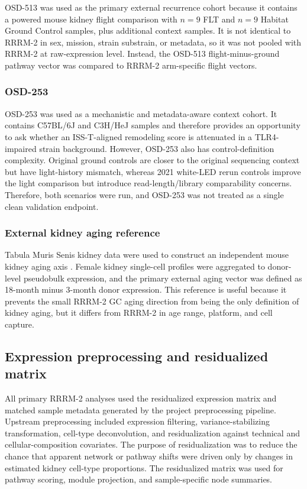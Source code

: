 \documentclass[11pt]{article}
\begin{document}
OSD-513 was used as the primary external recurrence cohort because it contains a powered mouse kidney flight comparison with $n=9$ FLT and $n=9$ Habitat Ground Control samples, plus additional context samples. It is not identical to RRRM-2 in sex, mission, strain substrain, or metadata, so it was not pooled with RRRM-2 at raw-expression level. Instead, the OSD-513 flight-minus-ground pathway vector was compared to RRRM-2 arm-specific flight vectors.

\subsubsection{OSD-253}

OSD-253 was used as a mechanistic and metadata-aware context cohort. It contains C57BL/6J and C3H/HeJ samples and therefore provides an opportunity to ask whether an ISS-T-aligned remodeling score is attenuated in a TLR4-impaired strain background. However, OSD-253 also has control-definition complexity. Original ground controls are closer to the original sequencing context but have light-history mismatch, whereas 2021 white-LED rerun controls improve the light comparison but introduce read-length/library comparability concerns. Therefore, both scenarios were run, and OSD-253 was not treated as a single clean validation endpoint.

\subsubsection{External kidney aging reference}

Tabula Muris Senis kidney data were used to construct an independent mouse kidney aging axis \citep{tabula2020}. Female kidney single-cell profiles were aggregated to donor-level pseudobulk expression, and the primary external aging vector was defined as 18-month minus 3-month donor expression. This reference is useful because it prevents the small RRRM-2 GC aging direction from being the only definition of kidney aging, but it differs from RRRM-2 in age range, platform, and cell capture.

\subsection{Expression preprocessing and residualized matrix}

All primary RRRM-2 analyses used the residualized expression matrix and matched sample metadata generated by the project preprocessing pipeline. Upstream preprocessing included expression filtering, variance-stabilizing transformation, cell-type deconvolution, and residualization against technical and cellular-composition covariates. The purpose of residualization was to reduce the chance that apparent network or pathway shifts were driven only by changes in estimated kidney cell-type proportions. The residualized matrix was used for pathway scoring, module projection, and sample-specific node summaries.
\end{document}
